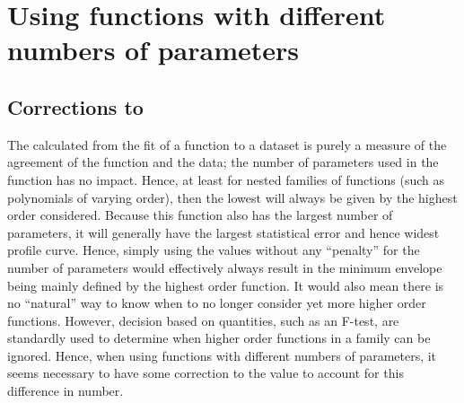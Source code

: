 \section{Using functions with different numbers of parameters} %
\label{sec:correction}

\subsection{Corrections to \nll}
\label{sec:correction:corrections}

The \nll calculated from the fit of a function to a dataset is purely a measure
of the agreement of the function and the data; the number of parameters
used in the function has no impact. Hence, at least for nested families of
functions (such as polynomials of varying order), then the lowest \nll will
always be given by the highest order considered.
Because this function also has the
largest number of parameters, it will generally have the largest statistical
error and hence widest \nll profile curve.
Hence, simply using the \nll values
without any ``penalty'' for the number of parameters would effectively
always result in the minimum envelope being mainly defined by the highest
order function. It would also mean there is no ``natural'' way to know when
to no longer consider yet more higher order functions. However, decision based
on quantities, such as an F-test, %
are standardly used to determine when higher order functions in
a family can be ignored. Hence, when using functions with different
numbers of parameters, it seems necessary to have some correction to the \nll
value to account for this difference in number.

